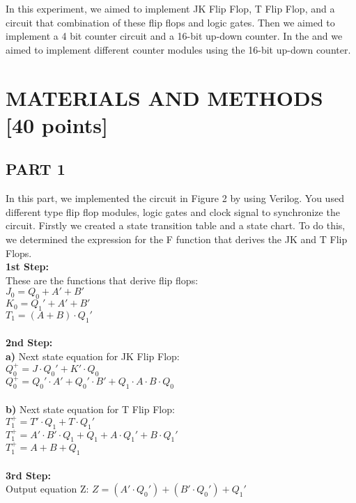\documentclass[pdftex,12pt,a4paper]{article}
\begin{document}
In this experiment, we aimed to implement JK Flip Flop, T Flip Flop, and a circuit that combination of these flip flops and logic gates. Then we aimed to implement a 4 bit counter circuit and a 16-bit up-down counter. In the and we aimed to implement different counter modules using the 16-bit up-down counter.

\section{MATERIALS AND METHODS [40 points]}



\subsection{PART 1}
In this part, we implemented the circuit in Figure 2 by using Verilog. You used different type flip flop modules, logic gates and clock signal to synchronize the circuit. Firstly we created a state transition table and a state chart. To do this, we determined the expression for the F function that derives the JK and T Flip Flops.\\
\textbf{1st Step: }\\
These are the functions that derive flip flops:\\
\(J_0 = Q_0 + A' + B'\) \\
\(K_0 = Q_1' + A' + B'  \)\\
\(T_1 = (A + B) \cdot Q_1'\)\\\\
\textbf{2nd Step: }\\
\textbf{a)} Next state equation for JK Flip Flop: \\
\(Q^{+}_{0} = J \cdot Q_0' + K' \cdot Q_0 \) \\
\(Q^{+}_{0} = Q_0' \cdot A' + Q_0' \cdot B' + Q_1 \cdot A \cdot B \cdot Q_0\) \\\\
\textbf{b)} Next state equation for T Flip Flop: \\
\(T^{+}_{1} = T' \cdot Q_1 + T \cdot Q_1'\) \\
\(T^{+}_{1} = A' \cdot B' \cdot Q_1 + Q_1 + A \cdot Q_1' + B \cdot Q_1'\) \\
\(T^{+}_{1} = A + B + Q_1\) \\\\
\textbf{3rd Step: }\\
Output equation Z:
\(Z = (A' \cdot Q_0') +  (B' \cdot Q_0') + Q_1'\)\\
\end{document}
